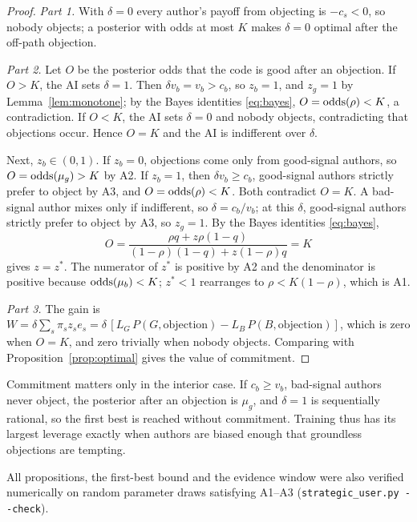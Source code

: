 \begin{proof}
\emph{Part 1.} With $\delta = 0$ every author's payoff from objecting is $-c_s < 0$, so nobody objects; a
posterior with odds at most $K$ makes $\delta = 0$ optimal after the off-path objection.

\emph{Part 2.} Let $O$ be the posterior odds that the code is good after an objection. If $O > K$, the AI
sets $\delta = 1$. Then $\delta v_b = v_b > c_b$, so $z_b = 1$, and $z_g = 1$ by
Lemma~\ref{lem:monotone}; by the Bayes identities \eqref{eq:bayes}, $O = \operatorname{odds}(\rho) < K$, a contradiction. If
$O < K$, the AI sets $\delta = 0$ and nobody objects, contradicting that objections occur. Hence
$O = K$ and the AI is indifferent over $\delta$.

Next, $z_b \in (0,1)$. If $z_b = 0$, objections come only from good-signal authors, so
$O = \operatorname{odds}(\mu_g) > K$ by A2. If $z_b = 1$, then $\delta v_b \ge c_b$, good-signal authors
strictly prefer to object by A3, and $O = \operatorname{odds}(\rho) < K$. Both contradict $O = K$. A
bad-signal author mixes only if indifferent, so $\delta = c_b / v_b$; at this $\delta$,
good-signal authors strictly prefer to object by A3, so $z_g = 1$. By the Bayes identities \eqref{eq:bayes},
\[
  O = \frac{\rho q + z \rho (1-q)}{(1-\rho)(1-q) + z (1-\rho) q} = K
\]
gives $z = z^*$. The numerator of $z^*$ is positive by A2 and the denominator is positive
because $\operatorname{odds}(\mu_b) < K$; $z^* < 1$ rearranges to $\rho < K(1-\rho)$, which is A1.

\emph{Part 3.} The gain is $W = \delta \sum_s \pi_s z_s e_s
= \delta\,[L_G\, P(G, \text{objection}) - L_B\, P(B, \text{objection})]$, which is zero when
$O = K$, and zero trivially when nobody objects. Comparing with
Proposition~\ref{prop:optimal} gives the value of commitment.
\end{proof}

\begin{remark}
Commitment matters only in the interior case. If $c_b \ge v_b$, bad-signal authors never object,
the posterior after an objection is $\mu_g$, and $\delta = 1$ is sequentially rational, so the
first best is reached without commitment. Training thus has its largest leverage exactly when
authors are biased enough that groundless objections are tempting.
\end{remark}

All propositions, the first-best bound and the evidence window were also verified numerically on
random parameter draws satisfying A1--A3 (\texttt{strategic\_user.py -{}-check}).

